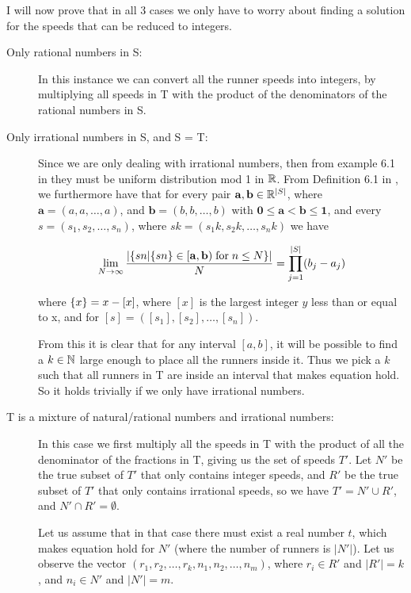 I will now prove that in all 3 cases we only have to worry about finding a solution for the speeds that can be reduced to integers.

\begin{description}
\item[Only rational numbers in S:] In this instance we can convert all the runner speeds into integers, by multiplying all speeds in T with the product of the denominators of the rational numbers in S.
\item[Only irrational numbers in S, and S = T:]
Since we are only dealing with irrational numbers, then from example 6.1 in \cite{uniform} they must be uniform distribution mod 1 in $\mathbb{R}$. 
From Definition 6.1 in \cite{uniform}, we furthermore have that for every pair $\mathbf{a}, \mathbf{b} \in \mathbb{R}^{|S|}$, where $\mathbf{a} = (a, a, \ldots, a)$, and $\mathbf{b} = (b, b, \ldots, b)$ with $\mathbf{0} \leq \mathbf{a} < \mathbf{b} \leq \mathbf{1}$, and every $s = (s_1, s_2, \ldots, s_n)$, where $sk = (s_1k, s_2k, \ldots, s_nk)$ we have

$$
\lim_{N \rightarrow \infty} \frac{
|\{
sn | \{sn\} \in [\mathbf{a}, \mathbf{b}) \;\mathrm{for}\;n \leq N
\}|
}{
N
} = 
\prod^{|S|}_{j=1}(b_j - a_j) 
$$

where $\{x\} = x - [x]$, where $[x]$ is the largest integer $y$ less than or equal to x, and for $[s] = ([s_1], [s_2], \ldots, [s_n])$.

From this it is clear that for any interval $[a, b]$, it will be possible to find a $k \in \mathbb{N}$ large enough to place all the runners inside it. Thus we pick a $k$ such that all runners in T are inside an interval that makes equation  hold. So it holds trivially if we only have irrational numbers.

\item[T is a mixture of natural/rational numbers and irrational numbers:]
In this case we first multiply all the speeds in T with the product of all the denominator of the fractions in T, giving us the set of speeds $T\prime$. Let $N\prime$ be the true subset of $T\prime$ that only contains integer speeds, and $R\prime$ be the true subset of $T\prime$ that only contains irrational speeds, so we have $T\prime = N\prime \cup R\prime$, and $N\prime \cap R\prime = \emptyset$.

Let us assume that in that case there must exist a real number $t$, which makes equation  hold for $N\prime$ (where the number of runners is $|N\prime|$). Let us observe the vector $(r_1, r_2, \ldots, r_k, n_1, n_2, \ldots, n_m)$, where $r_i \in R\prime$ and $|R\prime| = k$, and $n_i \in N\prime$ and $|N\prime| = m$. 


\end{description}
